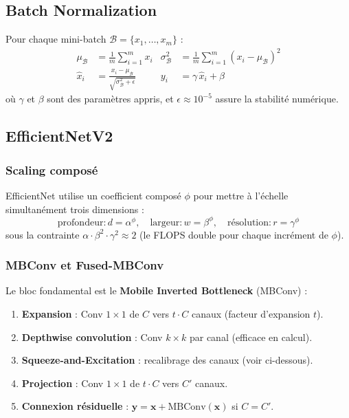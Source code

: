 \documentclass[11pt,a4paper]{article}
\begin{document}
\subsection{Batch Normalization}

Pour chaque mini-batch $\mathcal{B} = \{x_1, \ldots, x_m\}$ :
\begin{align}
  \mu_\mathcal{B} &= \frac{1}{m}\sum_{i=1}^{m} x_i & \sigma_\mathcal{B}^2 &= \frac{1}{m}\sum_{i=1}^{m}(x_i - \mu_\mathcal{B})^2 \\[4pt]
  \hat{x}_i &= \frac{x_i - \mu_\mathcal{B}}{\sqrt{\sigma_\mathcal{B}^2 + \epsilon}} & y_i &= \gamma\,\hat{x}_i + \beta
\end{align}
où $\gamma$ et $\beta$ sont des paramètres appris, et $\epsilon \approx 10^{-5}$ assure la stabilité numérique.

\subsection{EfficientNetV2}

\subsubsection{Scaling composé}

EfficientNet utilise un coefficient composé $\phi$ pour mettre à l'échelle simultanément trois dimensions :
\begin{equation}
  \text{profondeur} : d = \alpha^\phi, \quad
  \text{largeur} : w = \beta^\phi, \quad
  \text{résolution} : r = \gamma^\phi
\end{equation}
sous la contrainte $\alpha \cdot \beta^2 \cdot \gamma^2 \approx 2$ (le FLOPS double pour chaque incrément de $\phi$).

\subsubsection{MBConv et Fused-MBConv}

Le bloc fondamental est le \textbf{Mobile Inverted Bottleneck} (MBConv) :

\begin{enumerate}
  \item \textbf{Expansion} : Conv $1 \times 1$ de $C$ vers $t \cdot C$ canaux (facteur d'expansion $t$).
  \item \textbf{Depthwise convolution} : Conv $k \times k$ par canal (efficace en calcul).
  \item \textbf{Squeeze-and-Excitation} : recalibrage des canaux (voir ci-dessous).
  \item \textbf{Projection} : Conv $1 \times 1$ de $t \cdot C$ vers $C'$ canaux.
  \item \textbf{Connexion résiduelle} : $\mathbf{y} = \mathbf{x} + \text{MBConv}(\mathbf{x})$ si $C = C'$.
\end{enumerate}
\end{document}
